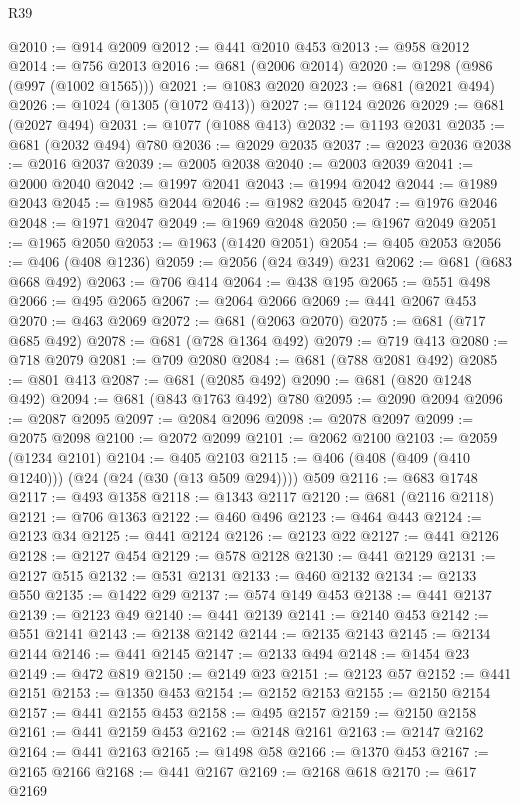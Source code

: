 \begin{lexlean}{R39}
\begin{coremodule}
@2010 := @914 @2009
@2012 := @441 @2010 @453
@2013 := @958 @2012
@2014 := @756 @2013
@2016 := @681 (@2006 @2014)
@2020 := @1298 (@986 (@997 (@1002 @1565)))
@2021 := @1083 @2020
@2023 := @681 (@2021 @494)
@2026 := @1024 (@1305 (@1072 @413))
@2027 := @1124 @2026
@2029 := @681 (@2027 @494)
@2031 := @1077 (@1088 @413)
@2032 := @1193 @2031
@2035 := @681 (@2032 @494) @780
@2036 := @2029 @2035
@2037 := @2023 @2036
@2038 := @2016 @2037
@2039 := @2005 @2038
@2040 := @2003 @2039
@2041 := @2000 @2040
@2042 := @1997 @2041
@2043 := @1994 @2042
@2044 := @1989 @2043
@2045 := @1985 @2044
@2046 := @1982 @2045
@2047 := @1976 @2046
@2048 := @1971 @2047
@2049 := @1969 @2048
@2050 := @1967 @2049
@2051 := @1965 @2050
@2053 := @1963 (@1420 @2051)
@2054 := @405 @2053
@2056 := @406 (@408 @1236)
@2059 := @2056 (@24 @349) @231
@2062 := @681 (@683 @668 @492)
@2063 := @706 @414
@2064 := @438 @195
@2065 := @551 @498
@2066 := @495 @2065
@2067 := @2064 @2066
@2069 := @441 @2067 @453
@2070 := @463 @2069
@2072 := @681 (@2063 @2070)
@2075 := @681 (@717 @685 @492)
@2078 := @681 (@728 @1364 @492)
@2079 := @719 @413
@2080 := @718 @2079
@2081 := @709 @2080
@2084 := @681 (@788 @2081 @492)
@2085 := @801 @413
@2087 := @681 (@2085 @492)
@2090 := @681 (@820 @1248 @492)
@2094 := @681 (@843 @1763 @492) @780
@2095 := @2090 @2094
@2096 := @2087 @2095
@2097 := @2084 @2096
@2098 := @2078 @2097
@2099 := @2075 @2098
@2100 := @2072 @2099
@2101 := @2062 @2100
@2103 := @2059 (@1234 @2101)
@2104 := @405 @2103
@2115 := @406 (@408 (@409 (@410 @1240))) (@24 (@24 (@30 (@13 @509 @294)))) @509
@2116 := @683 @1748
@2117 := @493 @1358
@2118 := @1343 @2117
@2120 := @681 (@2116 @2118)
@2121 := @706 @1363
@2122 := @460 @496
@2123 := @464 @443
@2124 := @2123 @34
@2125 := @441 @2124
@2126 := @2123 @22
@2127 := @441 @2126
@2128 := @2127 @454
@2129 := @578 @2128
@2130 := @441 @2129
@2131 := @2127 @515
@2132 := @531 @2131
@2133 := @460 @2132
@2134 := @2133 @550
@2135 := @1422 @29
@2137 := @574 @149 @453
@2138 := @441 @2137
@2139 := @2123 @49
@2140 := @441 @2139
@2141 := @2140 @453
@2142 := @551 @2141
@2143 := @2138 @2142
@2144 := @2135 @2143
@2145 := @2134 @2144
@2146 := @441 @2145
@2147 := @2133 @494
@2148 := @1454 @23
@2149 := @472 @819
@2150 := @2149 @23
@2151 := @2123 @57
@2152 := @441 @2151
@2153 := @1350 @453
@2154 := @2152 @2153
@2155 := @2150 @2154
@2157 := @441 @2155 @453
@2158 := @495 @2157
@2159 := @2150 @2158
@2161 := @441 @2159 @453
@2162 := @2148 @2161
@2163 := @2147 @2162
@2164 := @441 @2163
@2165 := @1498 @58
@2166 := @1370 @453
@2167 := @2165 @2166
@2168 := @441 @2167
@2169 := @2168 @618
@2170 := @617 @2169

\end{coremodule}
\end{lexlean}
